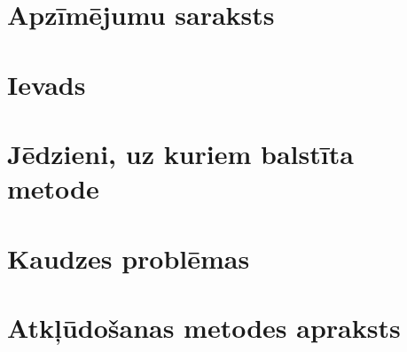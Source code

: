 \documentclass[12pt]{report}
\begin{document}

\setcounter{secnumdepth}{-1}

\clearpage


\tableofcontents
{}
\setcounter{page}{0}

\setcounter{secnumdepth}{-1}
\chapter{Apzīmējumu saraksts}



\setcounter{secnumdepth}{-1}
\chapter{Ievads}


\setcounter{secnumdepth}{2}
\setcounter{chapter}{0}
\chapter{Jēdzieni, uz kuriem balstīta metode}%

%



\chapter{Kaudzes problēmas}\label{chap:chapter_3} %


\chapter{Atkļūdošanas metodes apraksts}\label{chap:chapter_4} %


%
\end{document}
